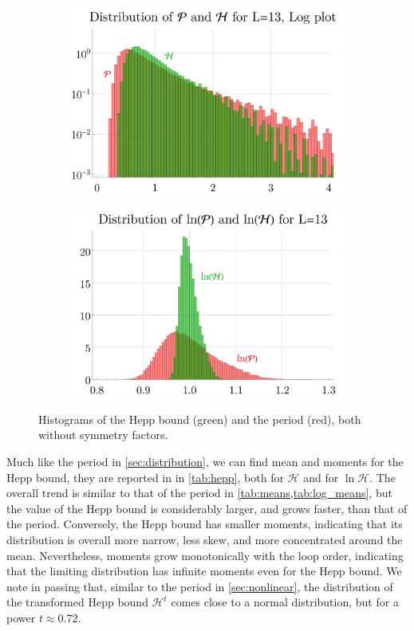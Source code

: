 \documentclass[12pt,a4paper]{article}
\renewcommand{\|}{\rule[-0.4ex]{0.2ex}{1.2em}}
\begin{document}
\begin{figure}[htbp]
	\begin{subfigure}[b]{.48 \textwidth}
		\includegraphics[width=\linewidth]{distribution_H_13_log}
	\end{subfigure}
	\begin{subfigure}[b]{.48 \textwidth}
		\includegraphics[width=\linewidth]{distribution_logH_13}
	\end{subfigure}
	
	\caption{Histograms of the Hepp bound (green) and the period (red), both without symmetry factors. }
	\label{histograms_H}
\end{figure}

Much like the period in \cref{sec:distribution}, we can find mean and moments  for the Hepp bound, they are reported in in \cref{tab:hepp}, both for $\mathcal H$ and for $\ln \mathcal H$. The overall trend is similar to that of the period in \cref{tab:means,tab:log_means}, but the value of the Hepp bound is considerably larger, and grows faster, than that of the period. Conversely, the Hepp bound has smaller moments, indicating that its distribution is overall more narrow, less skew, and more concentrated around the mean. Nevertheless, moments grow monotonically with the loop order, indicating that the limiting distribution has infinite moments even for the Hepp bound. 
We  note in passing that, similar to the period in \cref{sec:nonlinear}, the distribution of the transformed Hepp bound $\mathcal H^t$ comes close to a normal distribution, but for a power $t \approx 0.72$.  
\end{document}
